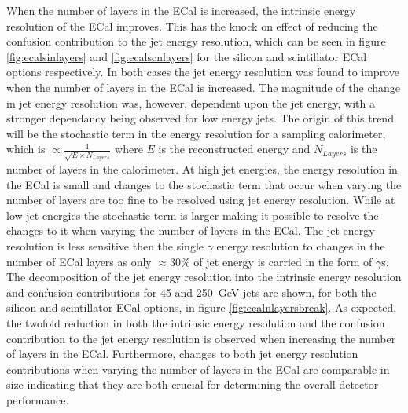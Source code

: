 When the number of layers in the ECal is increased, the intrinsic energy resolution of the ECal improves.  This has the knock on effect of reducing the confusion contribution to the jet energy resolution, which can be seen in figure \ref{fig:ecalsinlayers} and \ref{fig:ecalscnlayers} for the silicon and scintillator ECal options respectively.  In both cases the jet energy resolution was found to improve when the number of layers in the ECal is increased.  The magnitude of the change in jet energy resolution was, however, dependent upon the jet energy, with a stronger dependancy being observed for low energy jets.  The origin of this trend will be the stochastic term in the energy resolution for a sampling calorimeter, which is $\propto \frac{1}{\sqrt{E \times N_{Layers}}}$ where $E$ is the reconstructed energy and $N_{Layers}$ is the number of layers in the calorimeter.  At high jet energies, the energy resolution in the ECal is small and changes to the stochastic term that occur when varying the number of layers are too fine to be resolved using jet energy resolution.  While at low jet energies the stochastic term is larger making it possible to resolve the changes to it when varying the number of layers in the ECal.  The jet energy resolution is less sensitive then the single $\gamma$ energy resolution to changes in the number of ECal layers as only $\approx 30\%$ of jet energy is carried in the form of $\gamma$s.  The decomposition of the jet energy resolution into the intrinsic energy resolution and confusion contributions for 45 and 250~GeV jets are shown, for both the silicon and scintillator ECal options, in figure \ref{fig:ecalnlayersbreak}.  As expected, the twofold reduction in both the intrinsic energy resolution and the confusion contribution to the jet energy resolution is observed when increasing the number of layers in the ECal.  Furthermore, changes to both jet energy resolution contributions when varying the number of layers in the ECal are comparable in size indicating that they are both crucial for determining the overall detector performance.  

